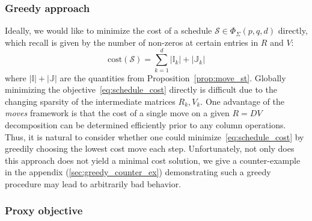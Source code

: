 \documentclass[sn-mathphys]{sn-jnl}
\begin{document}
\subsubsection{Greedy approach}\label{sec:greedy} 
Ideally, we would like to minimize the cost of a schedule $\mathcal{S} \in \Phi_\Sigma(p,q,d)$ directly, which recall is given by the number of non-zeros at certain entries in $R$ and $V$: 
\begin{equation}\label{eq:schedule_cost}
\mathrm{cost}(\mathcal{S}) = \sum\limits_{k=1}^d \lvert \mathbb{I}_k \rvert + \lvert \mathbb{J}_k\rvert
\end{equation}
where $\lvert \mathbb{I}\rvert + \lvert \mathbb{J}\rvert$ are the quantities from Proposition~\ref{prop:move_st}. 
Globally minimizing the objective~\eqref{eq:schedule_cost} directly is difficult due to the changing sparsity of the intermediate matrices $R_k, V_k$. 
One advantage of the \emph{moves} framework is that the cost of a single move on a given $R = D V$ decomposition can be determined efficiently prior to any column operations. Thus, it is natural to consider whether one could minimize~\eqref{eq:schedule_cost} by greedily choosing the lowest cost move each step. Unfortunately, not only does this approach does not yield a minimal cost solution, we give a counter-example in the appendix (\ref{sec:greedy_counter_ex}) demonstrating such a greedy procedure may lead to arbitrarily bad behavior. 

\subsubsection{Proxy objective}\label{sec:proxy_objective}

\end{document}
